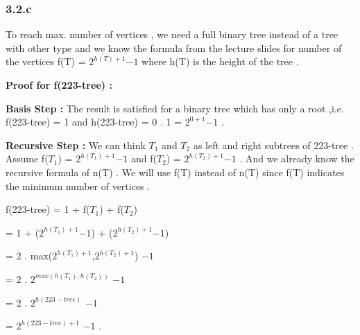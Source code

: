 \documentclass[12pt]{article}
\begin{document}
\subsubsection*{3.2.c}
\hspace{15px}To reach max. number of vertices , we need a full binary tree instead of a tree with other type and we know the formula from the lecture slides for number of the vertices f(T) = \textit{$2^{h(T)+1}$}\textit{$ - 1$} where h(T) is the height of the tree .\par 
\textbf{Proof for f(223-tree) :} \par 
\textbf{Basis Step :} The result is satisfied for a binary tree which has only a root ,i.e. f(223-tree) = 1 and h(223-tree) = 0 . 1 = \textit{$2^{0+1}$}\textit{$ - 1$} . \par 
\textbf{Recursive Step :} We can think \textit{$T_1$} and \textit{$T_2$} as left and right subtrees of 223-tree . Assume f(\textit{$T_1$}) = \textit{$2^{h(\textit{$T_1$})+1}$}\textit{$ - 1$} and f(\textit{$T_2$}) = \textit{$2^{h(\textit{$T_2$})+1}$}\textit{$ - 1$} . And we already know the recursive formula of n(T) . We will use f(T) instead of n(T) since f(T) indicates the minimum number of vertices .\par 
f(223-tree) = 1 + f(\textit{$T_1$}) + f(\textit{$T_2$}) \par 
\hspace{55px} = 1 + (\textit{$2^{h(\textit{$T_1$})+1}$}\textit{$ - 1$}) + (\textit{$2^{h(\textit{$T_2$})+1}$}\textit{$ - 1$}) \par 
\hspace{55px} = 2 . max(\textit{$2^{h(\textit{$T_1$})+1}$},\textit{$2^{h(\textit{$T_2$})+1}$}) \textit{$ - 1$} \par 
\hspace{55px} = 2 . \textit{$2^{max(h(\textit{$T_1$}),h(\textit{$T_2$}))}$} \textit{$ - 1$} \par 
\hspace{55px} = 2 . \textit{$2^{h(223-tree)}$} \textit{$ - 1$} \par 
\hspace{55px} = \textit{$2^{h(223-tree)+1}$} \textit{$ - 1$} . \\ \par 
\end{document}
